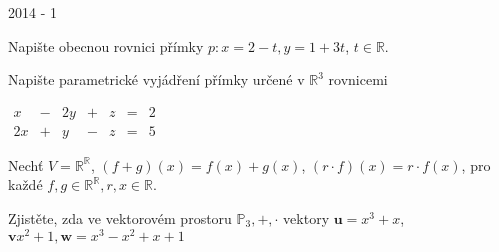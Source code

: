 
\newpage
{\large 2014 - 1}

\begin{questions}

\question Napište obecnou rovnici přímky \(p: x=2-t, y=1+3t\), \(t \in \mathbb{R}\).

\question Napište parametrické vyjádření přímky určené v \(\mathbb{R}^3\) rovnicemi

\begin{center}
    \(\begin{matrix}
        x  & - & 2y & + & z & = & 2\\
        2x & + & y  & - & z & = & 5
    \end{matrix}\)
\end{center}

\newpage

\question Nechť \(V = \mathbb{R}^\mathbb{R}\), \((f+g)(x) = f(x)+g(x)\), \((r \cdot f)(x)=r \cdot f(x)\), pro každé \(f, g \in \mathbb{R}^\mathbb{R}, r, x \in \mathbb{R}\).


\question Zjistěte, zda ve vektorovém prostoru \(\mathbb{P}_3, +, \cdot\) vektory \(\textbf{u} = x^3+x\), \(\textbf{v} x^2+1, \textbf{w} = x^3-x^2+x+1\)



\end{questions}
